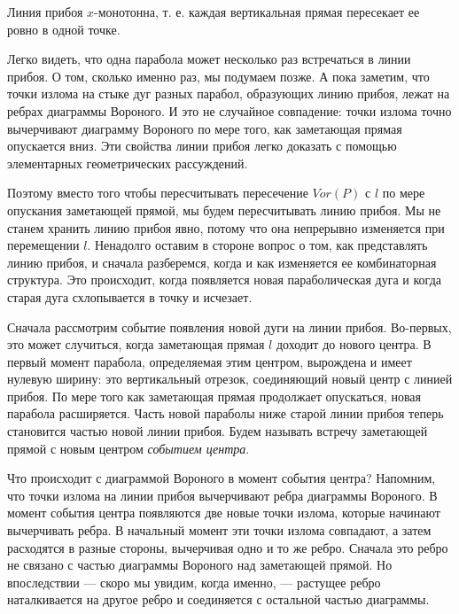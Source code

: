 \begin{observation}
    Линия  прибоя  $x$-монотонна,  т.  е. каждая  вертикальная  прямая  пересекает  ее  ровно  в  одной точке.
\end{observation}

Легко  видеть,  что  одна  парабола  может  несколько раз  встречаться  в  линии  прибоя. 
О  том,  сколько  именно раз,  мы  подумаем  позже. 
А  пока  заметим,  что  точки  излома  на  стыке  дуг  разных  парабол,  образующих  линию прибоя,  лежат  на  ребрах  диаграммы  Вороного.
И  это  не случайное  совпадение:  точки  излома  точно  вычерчивают  диаграмму  Вороного  по  мере  того,  как  заметающая  прямая  опускается  вниз. 
Эти  свойства  линии  прибоя  легко  доказать  с  помощью  элементарных  геометрических  рассуждений.

Поэтому  вместо  того  чтобы  пересчитывать  пересечение  $Vor(P)$  с $l$ по  мере  опускания  заметающей  прямой,  мы  будем  пересчитывать  линию  прибоя.
Мы  не  станем  хранить  линию  прибоя  явно,  потому  что  она  непрерывно  изменяется  при  перемещении $l$.
Ненадолго  оставим  в  стороне  вопрос  о  том,  как  представлять  линию прибоя,  и  сначала  разберемся,  когда  и  как  изменяется  ее  комбинаторная  структура.
Это  происходит,  когда  появляется  новая  параболическая  дуга и  когда  старая дуга  схлопывается  в  точку  и  исчезает.

Сначала  рассмотрим  событие  появления  новой  дуги  на  линии  прибоя.
Во-первых,  это  может  случиться,  когда  заметающая  прямая $l$  доходит  до  нового  центра.
В  первый  момент  парабола,  определяемая  этим  центром,  вырождена  и  имеет нулевую  ширину:  это  вертикальный  отрезок,  соединяющий  новый  центр  с  линией  прибоя.
По  мере  того  как  заметающая  прямая  продолжает  опускаться,  новая парабола  расширяется.
Часть  новой  параболы  ниже  старой  линии  прибоя  теперь становится  частью  новой  линии  прибоя.
Будем называть  встречу  заметающей  прямой  с  новым  центром  \textit{событием  центра}.

Что  происходит  с  диаграммой  Вороного  в  момент  события  центра?
Напомним, что  точки  излома  на  линии  прибоя  вычерчивают  ребра диаграммы  Вороного.
В  момент  события  центра  появляются  две  новые  точки  излома,  которые  начинают  вычерчивать  ребра. 
В  начальный момент  эти  точки  излома  совпадают,  а  затем  расходятся в  разные  стороны,  вычерчивая  одно  и  то  же  ребро.
Сначала  это  ребро  не  связано  с  частью  диаграммы  Вороного над  заметающей  прямой.
Но  впоследствии  ---  скоро  мы увидим,  когда  именно,  ---  растущее  ребро  наталкивается на  другое  ребро  и  соединяется  с  остальной  частью  диаграммы.

